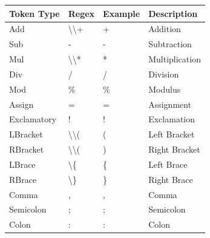 \documentclass{report}
\newcommand{\+}{}
\begin{document}
    \begin{table}[hb!]
        \centering
        \begin{tabular}{l|lll}
            \hline
            Token Type   & Regex                                                  & Example           & Description    \\ \hline
            Add          & \textbackslash{}\textbackslash{}+                      & +                 & Addition       \\
            Sub          & -                                                      & -                 & Subtraction    \\
            Mul          & \textbackslash{}\textbackslash{}*                      & *                 & Multiplication \\
            Div          & /                                                      & /                 & Division       \\
            Mod          & \%                                                     & \%                & Modulus        \\
            Assign       & =                                                      & =                 & Assignment     \\
            Exclamatory  & !                                                      & !                 & Exclamation    \\
            LBracket     & \textbackslash{}\textbackslash{}(                      & (                 & Left Bracket   \\
            RBracket     & \textbackslash{}\textbackslash{}(                      & )                 & Right Bracket  \\
            LBrace       & \textbackslash{}\{                                     & \{                & Left Brace     \\
            RBrace       & \textbackslash{}\}                                     & \}                & Right Brace    \\
            Comma        & ,                                                      & ,                 & Comma          \\
            Semicolon    & ;                                                      & ;                 & Semicolon      \\
            Colon        & :                                                      & :                 & Colon          \\

\end{tabular}
\end{table}
\end{document}
